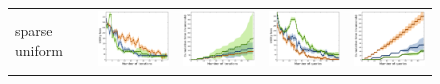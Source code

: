 \documentclass{article}
\renewcommand\[{\begin{equation}}
\renewcommand\]{\end{equation}}
\begin{document}
\begin{figure}
    \centering
    {\footnotesize
    \begin{tabular}{lcccc}
        \\
        {\sc sparse uniform} &
        \includegraphics[align=c,width=10em]{figures/pc_with_costs_uniform_sparse_per_iter_loss} &
        \includegraphics[align=c,width=10em]{figures/pc_with_costs_uniform_sparse_per_iter_time} &
        \includegraphics[align=c,width=10em]{figures/pc_with_costs_uniform_sparse_per_query_loss} &
        \includegraphics[align=c,width=10em]{figures/pc_with_costs_uniform_sparse_per_query_time}


\end{tabular}}
\end{figure}
\end{document}
